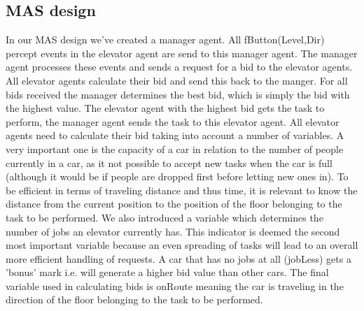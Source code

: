 \documentclass[a4paper,11pt]{article}
\begin{document}
\subsection{MAS design}
In our MAS design we've created a manager agent. All fButton(Level,Dir) percept events in the elevator agent are send to this manager agent. The manager agent processes these events and sends a request for a bid to the elevator agents. All elevator agents calculate their bid and send this back to the manger. For all bids received the manager determines the best bid, which is simply the bid with the highest value. The elevator agent with the highest bid gets the task to perform, the manager agent sends the task to this elevator agent. 
\newline\newline
All elevator agents need to calculate their bid taking into account a number of variables. A very important one is the capacity of a car in relation to the number of people currently in a car, as it not possible to accept new tasks when the car is full (although it would be if people are dropped first before letting new ones in). To be efficient in terms of traveling distance and thus time, it is relevant to know the distance from the current position to the position of the floor belonging to the task to be performed. We also introduced a variable which determines the number of jobs an elevator currently has. This indicator is deemed the second most important variable because an even spreading of tasks will lead to an overall more efficient handling of requests. A car that has no jobs at all (jobLess) gets a 'bonus' mark i.e. will generate a higher bid value than other cars. The final variable used in calculating bids is onRoute meaning the car is traveling in the direction of the floor belonging to the task to be performed. 

\pagebreak
\end{document}
